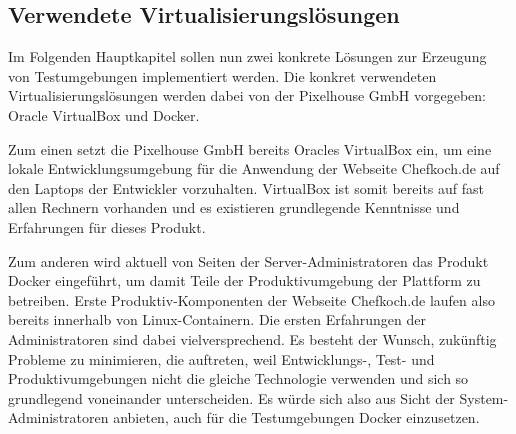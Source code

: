 \subsection{Verwendete Virtualisierungslösungen}

Im Folgenden Hauptkapitel sollen nun zwei konkrete Lösungen zur Erzeugung von Testumgebungen implementiert werden. Die konkret verwendeten Virtualisierungslösungen werden dabei von der Pixelhouse GmbH vorgegeben: Oracle VirtualBox und Docker.

Zum einen setzt die Pixelhouse GmbH bereits Oracles VirtualBox ein, um eine lokale Entwicklungsumgebung für die Anwendung der Webseite Chefkoch.de auf den Laptops der Entwickler vorzuhalten. VirtualBox ist somit bereits auf fast allen Rechnern vorhanden und es existieren grundlegende Kenntnisse und Erfahrungen für dieses Produkt.

Zum anderen wird aktuell von Seiten der Server-Administratoren das Produkt Docker eingeführt, um damit Teile der Produktivumgebung der Plattform zu betreiben. Erste Produktiv-Komponenten der Webseite Chefkoch.de laufen also bereits innerhalb von Linux-Containern. Die ersten Erfahrungen der Administratoren sind dabei vielversprechend. Es besteht der Wunsch, zukünftig Probleme zu minimieren, die auftreten, weil Entwicklungs-, Test- und Produktivumgebungen nicht die gleiche Technologie verwenden und sich so grundlegend voneinander unterscheiden. Es würde sich also aus Sicht der System-Administratoren anbieten, auch für die Testumgebungen Docker einzusetzen.
